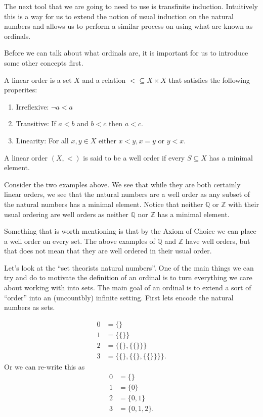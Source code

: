 The next tool that we are going to need to use is transfinite induction.
Intuitively this is a way for us to extend the notion of usual induction on the
natural numbers and allows us to perform a similar process on using what are
known as ordinals.

Before we can talk about what ordinals are, it is important for us to introduce
some other concepts first.

\begin{defn}
  A linear order is a set $X$ and a relation $< \subseteq X \times X$ that
  satisfies the following properites:
  \begin{enumerate}
    \item Irreflexive: $\neg a < a$
    \item Transitive: If $a < b$ and $b < c$ then $a < c$.
    \item Linearity: For all $x,y \in X$ either $x < y, x = y$ or $y < x$.
  \end{enumerate}
\end{defn}

\begin{defn}
  A linear order $(X, <)$ is said to be a well order if every $S \subseteq X$
  has a minimal element.
\end{defn}

Consider the two examples above. We see that while they are both certainly
linear orders, we see that the natural numbers are a well order as any subset
of the natural numbers has a minimal element. Notice that neither $\mathbb{Q}$
or $\mathbb{Z}$ with their usual ordering are well orders as neither
$\mathbb{Q}$ nor $\mathbb{Z}$ has a minimal element.

Something that is worth mentioning is that by the Axiom of Choice we can
place a well order on every set. The above examples of $\mathbb{Q}$ and
$\mathbb{Z}$ have well orders, but that does not mean that they are well
ordered in their usual order.

Let's look at the ``set theorists natural numbers''. One of the main things we
can try and do to motivate the definition of an ordinal is to turn everything
we care about working with into sets. The main goal of an ordinal is to
extend a sort of ``order'' into an (uncountbly) infinite setting. First lets
encode the natural numbers as sets.

\begin{align*}
  0 &= \{\} \\
  1 &= \{\{\}\} \\
  2 &= \{\{\}, \{\{\}\}\} \\
  3 &= \{\{\}, \{\{\}, \{\{\} \}\}\} 
.\end{align*}
Or we can re-write this as
\begin{align*}
  0 &= \{\} \\
  1 &= \{0\} \\
  2 &= \{0,1\} \\
  3 &= \{0,1,2\} 
.\end{align*}

